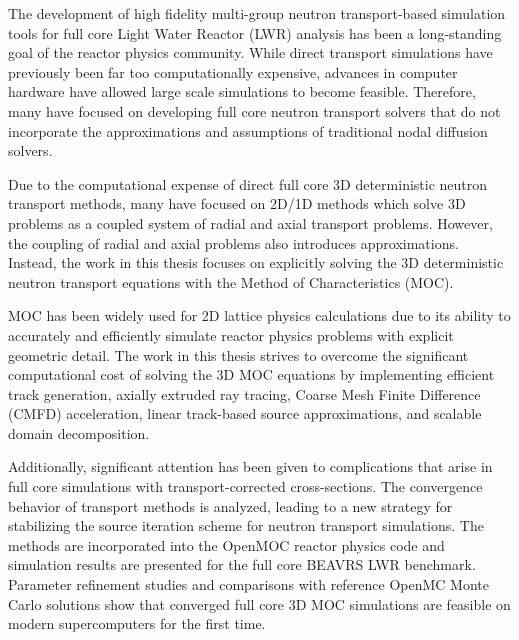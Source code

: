 \begin{abstractpage}

The development of high fidelity multi-group neutron transport-based simulation tools for full core Light Water Reactor (LWR) analysis has been a long-standing goal of the reactor physics community. While direct transport simulations have previously been far too computationally expensive, advances in computer hardware have allowed large scale simulations to become feasible. Therefore, many have focused on developing full core neutron transport solvers that do not incorporate the approximations and assumptions of traditional nodal diffusion solvers. 

Due to the computational expense of direct full core 3D deterministic neutron transport methods, many have focused on 2D/1D methods which solve 3D problems as a coupled system of radial and axial transport problems. However, the coupling of radial and axial problems also introduces approximations. Instead, the work in this thesis focuses on explicitly solving the 3D deterministic neutron transport equations with the Method of Characteristics (MOC).

MOC has been widely used for 2D lattice physics calculations due to its ability to accurately and efficiently simulate reactor physics problems with explicit geometric detail. The work in this thesis strives to overcome the significant computational cost of solving the 3D MOC equations by implementing efficient track generation, axially extruded ray tracing, Coarse Mesh Finite Difference (CMFD) acceleration, linear track-based source approximations, and scalable domain decomposition. 

Additionally, significant attention has been given to complications that arise in full core simulations with transport-corrected cross-sections. The convergence behavior of transport methods is analyzed, leading to a new strategy for stabilizing the source iteration scheme for neutron transport simulations. The methods are incorporated into the OpenMOC reactor physics code and simulation results are presented for the full core BEAVRS LWR benchmark. Parameter refinement studies and comparisons with reference OpenMC Monte Carlo solutions show that converged full core 3D MOC simulations are feasible on modern supercomputers for the first time.




\end{abstractpage}
